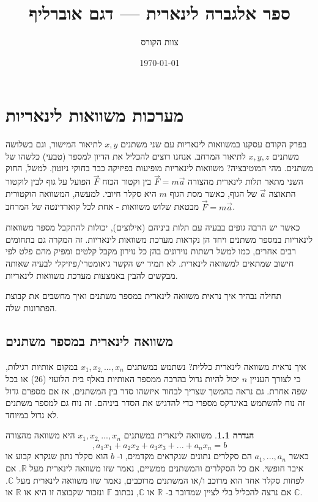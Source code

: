 \documentclass[12pt]{report}
\title{ספר אלגברה לינארית — דגם אוברליף}
\author{צוות הקורס}
\date{\today}
\theoremstyle{plain}
\theoremstyle{definition}
\newtheorem{definition}[theorem]{הגדרה}
\newcommand{\R}{\mathbb{R}}
\newcommand{\C}{\mathbb{C}}
\newcommand{\F}{\mathbb{F}}
\newcommand{\0}{\mathbf{0}}
\begin{document}
\maketitle

\chapter{מערכות משוואות לינאריות}\label{ch:systems}

בפרק הקודם עסקנו במשוואות לינאריות עם שני משתנים $x,y$ לתיאור
המישור, וגם בשלושה משתנים $x,y,z$ לתיאור המרחב. אנחנו רוצים להכליל
את הדיון למספר (טבעי) כלשהו של משתנים. מהי המוטיבציה? משוואות לינאריות מופיעות בפיזיקה כבר בחוקי ניוטון. למשל, החוק השני מתאר תלות לינארית מהצורה 
$\vec{F}=m\vec{a}$
בין וקטור הכוח
$\vec{F}$
הפועל על גוף לבין
לוקטור התאוצה 
$\vec{a}$
של הגוף, כאשר מסת הגוף 
$m$
היא סקלר חיובי. למעשה, המשוואה הוקטורית
$\vec{F}=m\vec{a}$
מבטאת שלוש משוואות - אחת לכל קוארדינטה של המרחב.

כאשר יש הרבה גופים בבעיה עם תלות ביניהם (אילוצים), יכולות להתקבל מספר משוואות לינאריות במספר משתנים ויחד הן נקראות מערכת משוואות לינאריות. זה המקרה גם בתחומים רבים אחרים, כמו למשל רשתות נוירונים
בהן כל נוירון מקבל קלטים ומפיק מהם פלט לפי חישוב שמתאים למשוואה לינארית. לא תמיד יש הקשר גיאומטרי/פיזיקלי לבעיה שאותה מבקשים להבין באמצעות מערכת משוואות לינאריות.

תחילה נבהיר איך נראית משוואה לינארית במספר משתנים
ואיך מחשבים את קבוצת הפתרונות שלה.

\section{משוואה לינארית במספר משתנים}

איך נראית משוואה לינארית כללית? נשתמש במשתנים $x_1,x_{2,}...,x_n$
במקום אותיות רגילות, כי לצורך העניין $n$ יכול להיות גדול בהרבה
ממספר האותיות באלף בית הלועזי ($26$) או בכל שפה אחרת. גם נראה
בהמשך שצריך לבחור איזשהו סדר בין המשתנים, אז אם מספרם גדול זה נוח
להשתמש באינדקס מספרי כדי להדגיש את הסדר ביניהם. זה נוח גם למספר משתנים לא גדול במיוחד.

\begin{definition}
משוואה לינארית במשתנים
$x_1,x_{2,}...,x_n$
היא משוואה מהצורה
\begin{equation}\label{eqn:linear-eq}
,a_1x_1+a_2x_2+a_3x_3+...+a_nx_n=b
\end{equation}
כאשר
$a_1,...,a_n$
הם סקלרים נתונים שנקראים מקדמים, ו-
$b$
הוא סקלר נתון שנקרא קבוע או איבר חופשי. אם כל הסקלרים והמשתנים ממשיים,
נאמר שזו משוואה לינארית מעל
$\R$.
אם לפחות סקלר אחד הוא מרוכב ו/או המשתנים מרוכבים, נאמר שזו משוואה לינארית מעל
$\C$.
אם נרצה להכליל בלי לציין שמדובר ב-
$\R$ או $\C$,
נכתוב
$\F$
ונזכור שקבוצה זו היא או
$\R$
או
$\C$.
\end{definition}
\end{document}
